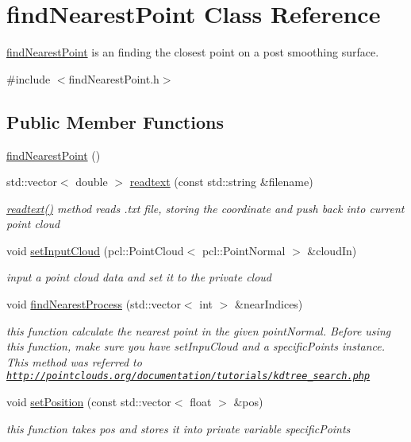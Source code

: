 \hypertarget{classfindNearestPoint}{}\section{find\+Nearest\+Point Class Reference}
\label{classfindNearestPoint}


\hyperlink{classfindNearestPoint}{find\+Nearest\+Point} is an finding the closest point on a post smoothing surface.  




{\ttfamily \#include $<$find\+Nearest\+Point.\+h$>$}

\subsection*{Public Member Functions}
\begin{DoxyCompactItemize}
\item 
\hyperlink{classfindNearestPoint_a1b67c72c67f69502153d72f7f9f9ec79}{find\+Nearest\+Point} ()
\item 
std\+::vector$<$ double $>$ \hyperlink{classfindNearestPoint_adc712dd3762652f1c808098a11ea83b3}{readtext} (const std\+::string \&filename)
\begin{DoxyCompactList}\small\item\em \hyperlink{classfindNearestPoint_adc712dd3762652f1c808098a11ea83b3}{readtext()} method reads .txt file, storing the coordinate and push back into current point cloud \end{DoxyCompactList}\item 
void \hyperlink{classfindNearestPoint_a9f3e8fede90d35373b86266f8b2be2b7}{set\+Input\+Cloud} (pcl\+::\+Point\+Cloud$<$ pcl\+::\+Point\+Normal $>$ \&cloud\+In)
\begin{DoxyCompactList}\small\item\em input a point cloud data and set it to the private cloud \end{DoxyCompactList}\item 
void \hyperlink{classfindNearestPoint_a4f0e81d1a66fbe367bdb879ae1b9e08f}{find\+Nearest\+Process} (std\+::vector$<$ int $>$ \&near\+Indices)
\begin{DoxyCompactList}\small\item\em this function calculate the nearest point in the given point\+Normal. Before using this function, make sure you have set\+Inpu\+Cloud and a specific\+Points instance. This method was referred to \href{http://pointclouds.org/documentation/tutorials/kdtree_search.php}{\tt http\+://pointclouds.\+org/documentation/tutorials/kdtree\+\_\+search.\+php} \end{DoxyCompactList}\item 
void \hyperlink{classfindNearestPoint_af50a6d88d17899637652b8e60da7ae43}{set\+Position} (const std\+::vector$<$ float $>$ \&pos)
\begin{DoxyCompactList}\small\item\em this function takes pos and stores it into private variable specific\+Points \end{DoxyCompactList}\end{DoxyCompactItemize}


